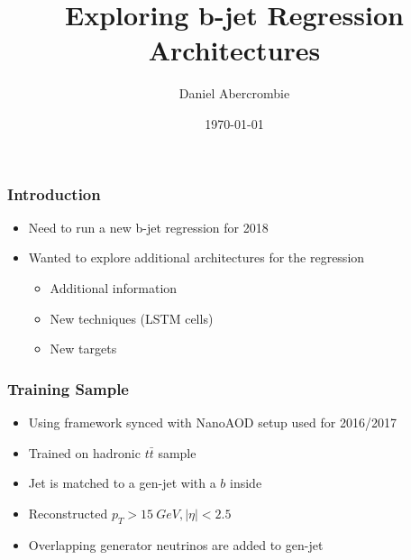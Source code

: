 \documentclass{beamer}
\author[D. Abercrombie]{
  Daniel Abercrombie
}
\title{\bf \sffamily Exploring b-jet Regression Architectures}
\date{\today}
\begin{document}
\begin{frame}
  \titlepage
\end{frame}

\begin{frame}
  \frametitle{Introduction}

  \begin{itemize}
  \item Need to run a new b-jet regression for 2018
  \item Wanted to explore additional architectures for the regression
    \begin{itemize}
    \item Additional information
    \item New techniques (LSTM cells)
    \item New targets
    \end{itemize}
  \end{itemize}

\end{frame}

\begin{frame}
  \frametitle{Training Sample}

  \begin{itemize}
  \item Using framework synced with NanoAOD setup used for 2016/2017
  \item Trained on hadronic $t\bar{t}$ sample
  \item Jet is matched to a gen-jet with a $b$ inside
  \item Reconstructed $p_T > \SI{15}{GeV}, |\eta| < 2.5$
  \item Overlapping generator neutrinos are added to gen-jet
  \end{itemize}

\end{frame}
\end{document}

